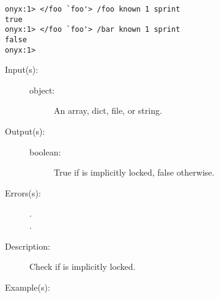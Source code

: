 \begin{description}
\begin{description}
\begin{verbatim}
onyx:1> </foo `foo'> /foo known 1 sprint
true
onyx:1> </foo `foo'> /bar known 1 sprint
false
onyx:1>
		\end{verbatim}
	\end{description}
\label{systemdict:lcheck}
\item[{\onyxop{object}{lcheck}{boolean}}: ]
	\begin{description}\item[]
	\item[Input(s): ]
		\begin{description}\item[]
		\item[object: ]
			An array, dict, file, or string.
		\end{description}
	\item[Output(s): ]
		\begin{description}\item[]
		\item[boolean: ]
			True if  is implicitly locked, false
			otherwise.
		\end{description}
	\item[Errors(s): ]
		\begin{description}\item[]
		\item[.]
		\item[.]
		\end{description}
	\item[Description: ]
		Check if  is implicitly locked.
	\item[Example(s): ]\begin{verbatim}


\end{verbatim}
\end{description}
\end{description}

